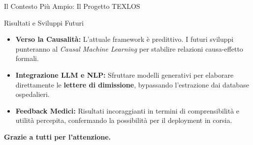 \documentclass[aspectratio=169, 10pt]{beamer}
\begin{document}
\begin{frame}{Il Contesto Più Ampio: Il Progetto TEXLOS}
  \vspace{1em}
  \begin{block}{Risultati e Sviluppi Futuri}
    \begin{itemize}
      \item \textbf{Verso la Causalità:} L'attuale framework è predittivo. I futuri sviluppi punteranno al \textit{Causal Machine Learning} per stabilire relazioni causa-effetto formali.
      \item \textbf{Integrazione LLM e NLP:} Sfruttare modelli generativi per elaborare direttamente le \textbf{lettere di dimissione}, bypassando l'estrazione dai database ospedalieri.
      \item \textbf{Feedback Medici:} Risultati incoraggianti in termini di comprensibilità e utilità percepita, confermando la possibilità per il deployment in corsia.
    \end{itemize}
  \end{block}
\end{frame}

\begin{frame}
  \vfill
  \centering
  \Large\textbf{Grazie a tutti per l'attenzione.}
  \vfill
\end{frame}

\appendix
\end{document}
